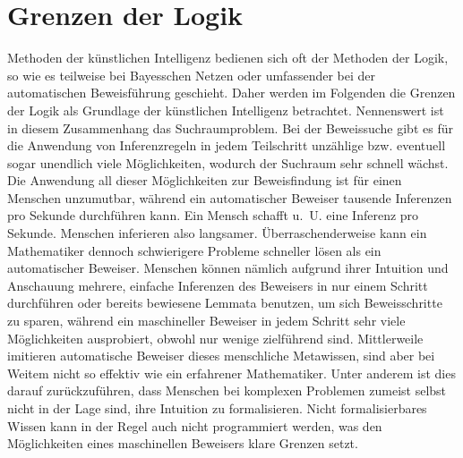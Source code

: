 \section{Grenzen der Logik}
Methoden der künstlichen Intelligenz bedienen sich oft der Methoden der Logik, so wie es teilweise bei Bayesschen Netzen oder umfassender bei der automatischen Beweisführung geschieht.
Daher werden im Folgenden die Grenzen der Logik als Grundlage der künstlichen Intelligenz betrachtet.
Nennenswert ist in diesem Zusammenhang das Suchraumproblem.
Bei der Beweissuche gibt es für die Anwendung von Inferenzregeln in jedem Teilschritt unzählige bzw.
eventuell sogar unendlich viele Möglichkeiten, wodurch der Suchraum sehr schnell wächst.
Die Anwendung all dieser Möglichkeiten zur Beweisfindung ist für einen Menschen unzumutbar, während ein automatischer Beweiser tausende Inferenzen pro Sekunde durchführen kann.
Ein Mensch schafft u.~U.
eine Inferenz pro Sekunde.
Menschen inferieren also langsamer.
Überraschenderweise kann ein Mathematiker dennoch schwierigere Probleme schneller lösen als ein automatischer Beweiser.
Menschen können nämlich aufgrund ihrer Intuition und Anschauung mehrere, einfache Inferenzen des Beweisers in nur einem Schritt durchführen oder bereits bewiesene Lemmata benutzen, um sich Beweisschritte zu sparen, während ein maschineller Beweiser in jedem Schritt sehr viele Möglichkeiten ausprobiert, obwohl nur wenige zielführend sind.
Mittlerweile imitieren automatische Beweiser dieses menschliche Metawissen, sind aber bei Weitem nicht so effektiv wie ein erfahrener Mathematiker.
Unter anderem ist dies darauf zurückzuführen, dass Menschen bei komplexen Problemen zumeist selbst nicht in der Lage sind, ihre Intuition zu formalisieren.
Nicht formalisierbares Wissen kann in der Regel auch nicht programmiert werden, was den Möglichkeiten eines maschinellen Beweisers klare Grenzen setzt.

